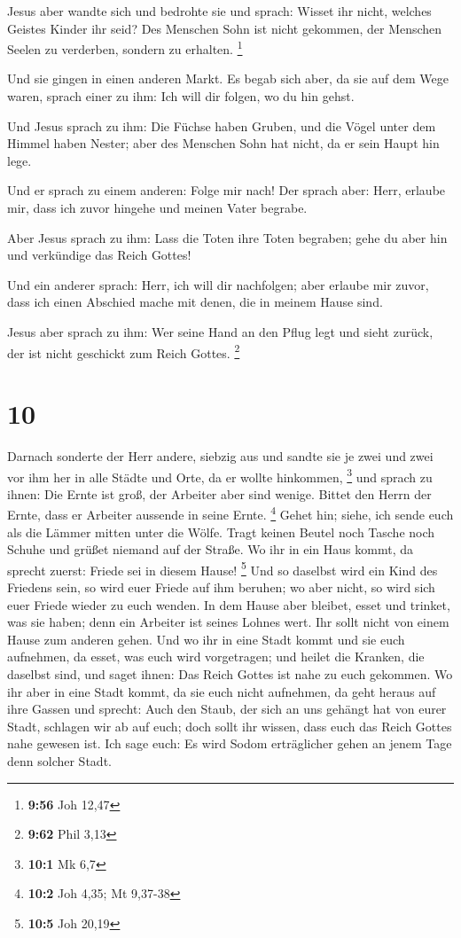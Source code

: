  Jesus aber wandte sich und bedrohte sie und sprach: Wisset
ihr nicht, welches Geistes Kinder ihr seid?  Des Menschen
Sohn ist nicht gekommen, der Menschen Seelen zu verderben, sondern zu
erhalten. \footnote{\textbf{9:56} Joh 12,47}

 Und sie gingen in einen anderen Markt. Es begab sich aber,
da sie auf dem Wege waren, sprach einer zu ihm: Ich will dir folgen, wo
du hin gehst.

 Und Jesus sprach zu ihm: Die Füchse haben Gruben, und die
Vögel unter dem Himmel haben Nester; aber des Menschen Sohn hat nicht,
da er sein Haupt hin lege.

 Und er sprach zu einem anderen: Folge mir nach! Der sprach
aber: Herr, erlaube mir, dass ich zuvor hingehe und meinen Vater
begrabe.

 Aber Jesus sprach zu ihm: Lass die Toten ihre Toten
begraben; gehe du aber hin und verkündige das Reich Gottes!

 Und ein anderer sprach: Herr, ich will dir nachfolgen;
aber erlaube mir zuvor, dass ich einen Abschied mache mit denen, die in
meinem Hause sind.

 Jesus aber sprach zu ihm: Wer seine Hand an den Pflug legt
und sieht zurück, der ist nicht geschickt zum Reich Gottes. \footnote{\textbf{9:62}
  Phil 3,13}

\hypertarget{section-4}{%
\section{10}\label{section-4}}

 Darnach sonderte der Herr andere, siebzig aus und sandte
sie je zwei und zwei vor ihm her in alle Städte und Orte, da er wollte
hinkommen, \footnote{\textbf{10:1} Mk 6,7}  und sprach zu
ihnen: Die Ernte ist groß, der Arbeiter aber sind wenige. Bittet den
Herrn der Ernte, dass er Arbeiter aussende in seine Ernte. \footnote{\textbf{10:2}
  Joh 4,35; Mt 9,37-38}  Gehet hin; siehe, ich sende euch
als die Lämmer mitten unter die Wölfe.  Tragt keinen Beutel
noch Tasche noch Schuhe und grüßet niemand auf der Straße. 
Wo ihr in ein Haus kommt, da sprecht zuerst: Friede sei in diesem Hause!
\footnote{\textbf{10:5} Joh 20,19}  Und so daselbst wird ein
Kind des Friedens sein, so wird euer Friede auf ihm beruhen; wo aber
nicht, so wird sich euer Friede wieder zu euch wenden.  In
dem Hause aber bleibet, esset und trinket, was sie haben; denn ein
Arbeiter ist seines Lohnes wert. Ihr sollt nicht von einem Hause zum
anderen gehen.  Und wo ihr in eine Stadt kommt und sie euch
aufnehmen, da esset, was euch wird vorgetragen;  und heilet
die Kranken, die daselbst sind, und saget ihnen: Das Reich Gottes ist
nahe zu euch gekommen.  Wo ihr aber in eine Stadt kommt, da
sie euch nicht aufnehmen, da geht heraus auf ihre Gassen und sprecht:
 Auch den Staub, der sich an uns gehängt hat von eurer
Stadt, schlagen wir ab auf euch; doch sollt ihr wissen, dass euch das
Reich Gottes nahe gewesen ist.  Ich sage euch: Es wird
Sodom erträglicher gehen an jenem Tage denn solcher Stadt.

